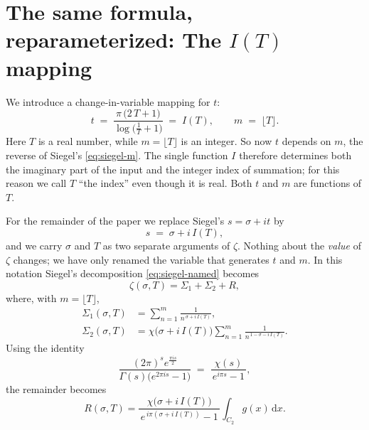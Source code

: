 \documentclass[11pt]{article}
\theoremstyle{definition}
\begin{document}
\section{The same formula, reparameterized: The \texorpdfstring{$I(T)$}{I(T)} mapping}\label{sec:IT}

We introduce a change-in-variable mapping for $t$:
\begin{equation}\label{eq:IT}
t
\;=\;
\frac{\pi\,\bigl(2\,T + 1\bigr)}{\log\!\bigl(\tfrac{1}{T} + 1\bigr)}
\;=\; I(T),
\qquad
m \;=\; \lfloor T\rfloor .
\end{equation}
Here $T$ is a real number, while $m=\lfloor T\rfloor$ is an integer. So now
$t$ depends on $m$, the reverse of Siegel's \eqref{eq:siegel-m}. The single
function $I$ therefore determines both the imaginary part of the input and the
integer index of summation; for this reason we call $T$ ``the index'' even
though it is real. Both $t$ and $m$ are functions of $T$.

For the remainder of the paper we replace Siegel's $s=\sigma+it$ by
\begin{equation}
s \;=\; \sigma + i\,I(T),
\end{equation}
and we carry $\sigma$ and $T$ as two separate arguments of $\zeta$. Nothing about
the \emph{value} of $\zeta$ changes; we have only renamed the variable that
generates $t$ and $m$. In this notation Siegel's decomposition
\eqref{eq:siegel-named} becomes
\begin{equation}\label{eq:zeta-T}
\zeta(\sigma,T)
=
\Sigma_{1} + \Sigma_{2} + R,
\end{equation}
where, with $m=\lfloor T\rfloor$,
\begin{align}
\Sigma_{1}(\sigma,T) &= \sum_{n=1}^{m}
\frac{1}{n^{\,\sigma + i\,I(T)}}, \\[4pt]
\Sigma_{2}(\sigma,T) &= \chi\!\bigl(\sigma + i\,I(T)\bigr)
\sum_{n=1}^{m}
\frac{1}{n^{\,1 - \sigma - i\,I(T)}} .
\end{align}
Using the identity
\begin{equation}
\frac{(2\pi)^s e^{\tfrac{\pi i s}{2}}}{\Gamma(s)\bigl(e^{2\pi i s}-1\bigr)}
\;=\;
\frac{\chi(s)}{\,e^{i\pi s}-1\,},
\end{equation}
the remainder becomes
\begin{equation}\label{eq:R-T}
R(\sigma,T)
=
\frac{\chi\!\bigl(\sigma + i\,I(T)\bigr)}{\,e^{\,i\pi (\sigma + i\,I(T))}-1\,}
\int_{C_2} g(x)\,\mathrm{d}x .
\end{equation}
\end{document}
